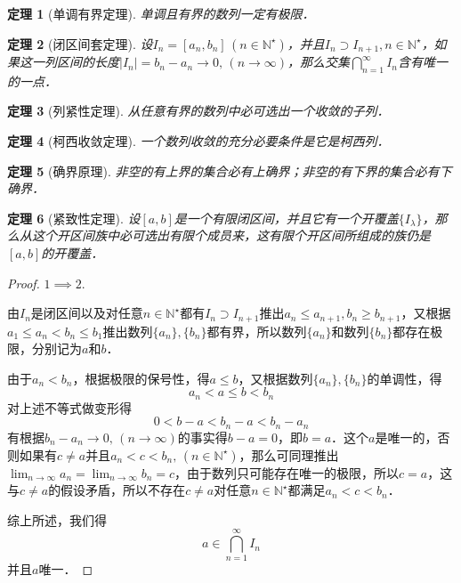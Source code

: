 \documentclass{ctexart}
\theoremstyle{definition}
\theoremstyle{definition}
\theoremstyle{plain}
\theoremstyle{plain}
\newtheorem{theorem}{定理}
\theoremstyle{plain}
\theoremstyle{definition}
\newcommand{\nat}{\mathbb{N}^\star}
\begin{document}
\begin{theorem}[单调有界定理]
    单调且有界的数列一定有极限．
\end{theorem}

\begin{theorem}[闭区间套定理]
设$I_n=[a_n,b_n]\,(n\in\mathbb{N}^\star)$，并且$I_{n} \supset I_{n+1}, n \in \nat$，如果这一列区间的长度$|I_n|=b_n-a_n\to 0,\,(n\to\infty)$，那么交集$\displaystyle\bigcap_{n=1}^\infty I_n$含有唯一的一点．
\end{theorem}

\begin{theorem}[列紧性定理]
从任意有界的数列中必可选出一个收敛的子列．
\end{theorem}

\begin{theorem}[柯西收敛定理]
一个数列收敛的充分必要条件是它是柯西列．
\end{theorem}

\begin{theorem}[确界原理]
非空的有上界的集合必有上确界；非空的有下界的集合必有下确界．
\end{theorem}

\begin{theorem}[紧致性定理]
设$[a,b]$是一个有限闭区间，并且它有一个开覆盖$\{ I_\lambda \}$，那么从这个开区间族中必可选出有限个成员来，这有限个开区间所组成的族仍是$[a,b]$的开覆盖．
\end{theorem}

\begin{proof}
$1 \implies 2$. 

\noindent 由$I_n$是闭区间以及对任意$n \in \nat$都有$I_n \supset I_{n+1}$推出$a_n \leq a_{n+1}, b_{n} \geq b_{n+1}$，又根据$a_1 \leq a_n < b_n \leq b_1$推出数列$\{a_n\}, \{b_n\}$都有界，所以数列$\{a_n\}$和数列$\{b_n\}$都存在极限，分别记为$a$和$b$．

\noindent 由于$a_n < b_n$，根据极限的保号性，得$a \leq b$，又根据数列$\{a_n\}, \{b_n\}$的单调性，得
\begin{equation}
    a_n < a \leq b < b_n
\end{equation}
对上述不等式做变形得
\begin{equation}
    0 < b - a < b_n - a < b_n - a_n
\end{equation}
有根据$b_n - a_n \to 0, \, (n \to \infty)$的事实得$b-a=0$，即$b=a$．这个$a$是唯一的，否则如果有$c\neq a$并且$a_n < c < b_n, \, (n \in \nat)$，那么可同理推出$\displaystyle \lim_{n\to\infty} a_n = \lim_{n\to\infty} b_n = c$，由于数列只可能存在唯一的极限，所以$c=a$，这与$c\neq a$的假设矛盾，所以不存在$c \neq a$对任意$n\in\nat$都满足$a_n<c<b_n$．

\noindent 综上所述，我们得
\begin{equation}
    a \in \bigcap_{n=1}^\infty I_n
\end{equation}
并且$a$唯一．
\end{proof}
\end{document}
